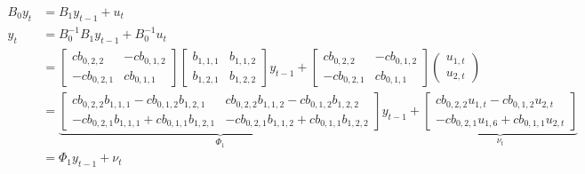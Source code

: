 \begin{enumerate}
\begin{sol}
              \begin{align*}
                  B_0 y_t & = B_1 y_{t-1} + u_t
                  \\[0.4cm]
                  y_t     & = B_0^{-1} B_1 y_{t-1} + B_0^{-1} u_t
                  \\[0.4cm]
                          & = \begin{bmatrix} %
                                  c b_{0, 2, 2}  & -c b_{0, 1, 2} \\
                                  -c b_{0, 2, 1} & c b_{0, 1, 1}
                              \end{bmatrix}
                  \begin{bmatrix} %
                      b_{1, 1, 1} & b_{1, 1, 2} \\
                      b_{1, 2, 1} & b_{1, 2, 2}
                  \end{bmatrix}
                  y_{t-1}
                  +
                  \begin{bmatrix} %
                      c b_{0, 2, 2}  & -c b_{0, 1, 2} \\
                      -c b_{0, 2, 1} & c b_{0, 1, 1}
                  \end{bmatrix}
                  \begin{pmatrix}
                      u_{1, t} \\
                      u_{2, t}
                  \end{pmatrix}
                  \\[0.4cm]
                          & =
                  \underbrace{
                      \begin{bmatrix} %
                          c b_{0, 2, 2} b_{1, 1, 1}
                          - c b_{0, 1, 2} b_{1, 2, 1}
                           & c b_{0, 2, 2} b_{1, 1, 2}
                          - c b_{0, 1, 2} b_{1, 2, 2}
                          \\
                          -c b_{0, 2, 1} b_{1, 1, 1}
                          + c b_{0, 1, 1} b_{1, 2, 1}
                           & -c b_{0, 2, 1} b_{1, 1, 2}
                          + c b_{0, 1, 1} b_{1, 2, 2}
                      \end{bmatrix}
                  }_{\Phi_1}
                  y_{t-1}
                  +
                  \underbrace{
                      \begin{bmatrix} %
                          c b_{0, 2, 2} u_{1, t} - c b_{0, 1, 2} u_{2, t} \\
                          -c b_{0, 2, 1} u_{1, 6} + c b_{0, 1, 1} u_{2, t}
                      \end{bmatrix}
                  }_{\nu_t}
                  \\[0.4cm]
                          & = \Phi_1 y_{t-1} + \nu_t
              \end{align*}
          \end{sol}


\end{enumerate}
